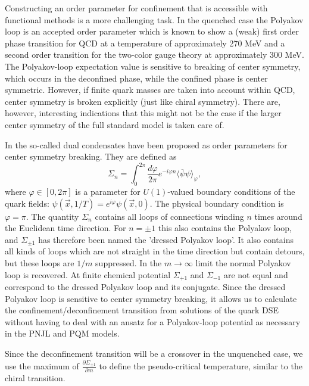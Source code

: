 \documentclass[a4paper,fleqn]{cas-dc}
\begin{document}
Constructing an order parameter for confinement that is accessible with functional methods is a more challenging task.
In the quenched case the Polyakov loop is an accepted order parameter which is known to show a (weak) first order phase
transition for QCD at a temperature of approximately 270 MeV and a second order transition for the two-color gauge theory
at approximately 300 MeV. The Polyakov-loop expectation value is sensitive to breaking of center symmetry, which occurs in
the deconfined phase, while the confined phase is center symmetric. However, if finite quark masses are taken into account
within QCD, center symmetry is broken explicitly (just like chiral symmetry). There are, however, interesting indications
that this might not be the case if the larger center symmetry of the full standard model is taken care of.

In \cite{PhysRevLett.97.032003,PhysRevD.75.114003,PhysRevD.77.094007} the so-called dual condensates have been proposed as order parameters for center symmetry breaking. They
are defined as
\begin{equation}
	\Sigma_n = \int_{0}^{2\pi} \frac{d \varphi}{2 \pi} e^{-i \varphi n} \langle \overline{\psi}\psi \rangle_\varphi,
\end{equation}
where $\varphi \in [ 0 , 2\pi ]$ is a parameter for $U (1 )$-valued boundary conditions of the quark fields: $\psi(\vec{x} , 1 / T ) = e^{i\varphi} \psi(\vec{x} , 0 )$. The
physical boundary condition is $\varphi = \pi$. The quantity $\Sigma_n$ contains all loops of connections winding $n$ times around the
Euclidean time direction. For $n = ± 1$ this also contains the Polyakov loop, and $\Sigma_{\pm 1}$ has therefore been named the 'dressed
Polyakov loop’. It also contains all kinds of loops which are not straight in the time direction but contain detours, but these
loops are $1 / m$ suppressed. In the $m \rightarrow \infty$ limit the normal Polyakov loop is recovered. At finite chemical potential $\Sigma_{+1}$
and $\Sigma_{- 1}$ are not equal and correspond to the dressed Polyakov loop and its conjugate. Since the dressed Polyakov loop is
sensitive to center symmetry breaking, it allows us to calculate the confinement/deconfinement transition from solutions of
the quark DSE without having to deal with an ansatz for a Polyakov-loop potential as necessary in the PNJL and PQM models.


Since the deconfinement transition will be a crossover in the unquenched case, we use the maximum of $\frac{\partial \Sigma_{\pm 1}}{\partial m} $ to define
the pseudo-critical temperature, similar to the chiral transition.
\end{document}
